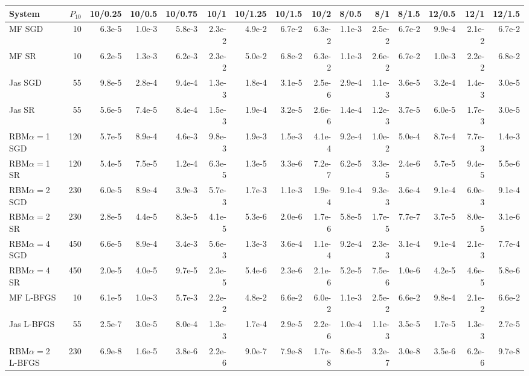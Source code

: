 \begin{tabular}{lrrrrrrrrrrrrrr}\toprule
System & $P_{10}$ & 10/0.25 & 10/0.5 & 10/0.75 & 10/1 & 10/1.25 & 10/1.5 & 10/2 & 8/0.5 & 8/1 & 8/1.5 & 12/0.5 & 12/1 & 12/1.5 \\\midrule
MF SGD & 10 & 6.3e-5 & 1.0e-3 & 5.8e-3 & 2.3e-2 & 4.9e-2 & 6.7e-2 & 6.3e-2 & 1.1e-3 & 2.5e-2 & 6.7e-2 & 9.9e-4 & 2.1e-2 & 6.7e-2 \\
MF SR & 10 & 6.2e-5 & 1.3e-3 & 6.2e-3 & 2.3e-2 & 5.0e-2 & 6.8e-2 & 6.3e-2 & 1.1e-3 & 2.6e-2 & 6.7e-2 & 1.0e-3 & 2.2e-2 & 6.8e-2 \\
Jas SGD & 55 & 9.8e-5 & 2.8e-4 & 9.4e-4 & 1.3e-3 & 1.8e-4 & 3.1e-5 & 2.5e-6 & 2.9e-4 & 1.1e-3 & 3.6e-5 & 3.2e-4 & 1.4e-3 & 3.0e-5 \\
Jas SR & 55 & 5.6e-5 & 7.4e-5 & 8.4e-4 & 1.5e-3 & 1.9e-4 & 3.2e-5 & 2.6e-6 & 1.4e-4 & 1.2e-3 & 3.7e-5 & 6.0e-5 & 1.7e-3 & 3.0e-5 \\
RBM$\alpha{=}$1 SGD & 120 & 5.7e-5 & 8.9e-4 & 4.6e-3 & 9.8e-3 & 1.9e-3 & 1.5e-3 & 4.1e-4 & 9.2e-4 & 1.0e-2 & 5.0e-4 & 8.7e-4 & 7.7e-3 & 1.4e-3 \\
RBM$\alpha{=}$1 SR & 120 & 5.4e-5 & 7.5e-5 & 1.2e-4 & 6.3e-5 & 1.3e-5 & 3.3e-6 & 7.2e-7 & 6.2e-5 & 3.3e-5 & 2.4e-6 & 5.7e-5 & 9.4e-5 & 5.5e-6 \\
RBM$\alpha{=}$2 SGD & 230 & 6.0e-5 & 8.9e-4 & 3.9e-3 & 5.7e-3 & 1.7e-3 & 1.1e-3 & 1.9e-4 & 9.1e-4 & 9.3e-3 & 3.6e-4 & 9.1e-4 & 6.0e-3 & 9.1e-4 \\
RBM$\alpha{=}$2 SR & 230 & 2.8e-5 & 4.4e-5 & 8.3e-5 & 4.1e-5 & 5.3e-6 & 2.0e-6 & 1.7e-6 & 5.8e-5 & 1.7e-5 & 7.7e-7 & 3.7e-5 & 8.0e-5 & 3.1e-6 \\
RBM$\alpha{=}$4 SGD & 450 & 6.6e-5 & 8.9e-4 & 3.4e-3 & 5.6e-3 & 1.3e-3 & 3.6e-4 & 1.1e-4 & 9.2e-4 & 2.3e-3 & 3.1e-4 & 9.1e-4 & 2.1e-3 & 7.7e-4 \\
RBM$\alpha{=}$4 SR & 450 & 2.0e-5 & 4.0e-5 & 9.7e-5 & 2.3e-5 & 5.4e-6 & 2.3e-6 & 2.1e-6 & 5.2e-5 & 7.5e-6 & 1.0e-6 & 4.2e-5 & 4.6e-5 & 5.8e-6 \\
\midrule
MF L-BFGS & 10 & 6.1e-5 & 1.0e-3 & 5.7e-3 & 2.2e-2 & 4.8e-2 & 6.6e-2 & 6.0e-2 & 1.1e-3 & 2.5e-2 & 6.6e-2 & 9.8e-4 & 2.1e-2 & 6.6e-2 \\
Jas L-BFGS & 55 & 2.5e-7 & 3.0e-5 & 8.0e-4 & 1.3e-3 & 1.7e-4 & 2.9e-5 & 2.2e-6 & 1.0e-4 & 1.1e-3 & 3.5e-5 & 1.7e-5 & 1.3e-3 & 2.7e-5 \\
RBM$\alpha{=}$2 L-BFGS & 230 & 6.9e-8 & 1.6e-5 & 3.8e-6 & 2.2e-6 & 9.0e-7 & 7.9e-8 & 1.7e-8 & 8.6e-5 & 3.2e-7 & 3.0e-8 & 3.5e-6 & 6.2e-6 & 9.7e-8 \\
\bottomrule\end{tabular}

